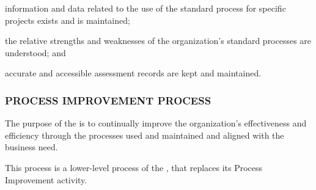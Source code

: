 			\begin{adjustwidth}{2em}{0pt} 

				\begin{compactitem}

					\item information and data related to the use of the standard process for specific projects exists and is maintained;

					\item the relative strengths and weaknesses of the organization's standard processes are understood; and

					\item accurate and accessible assessment records are kept and maintained.

				\end{compactitem}

			\end{adjustwidth}

		\subsubsection{PROCESS IMPROVEMENT PROCESS\label{llproc:process_improvement_process}}

			\begin{adjustwidth}{2em}{0pt} 
				
				The purpose of the  is to continually improve the organization's effectiveness and efficiency through the processes used and maintained and aligned with the business need.

				This process is a lower-level process of the , that replaces its Process Improvement activity.

			\end{adjustwidth}

